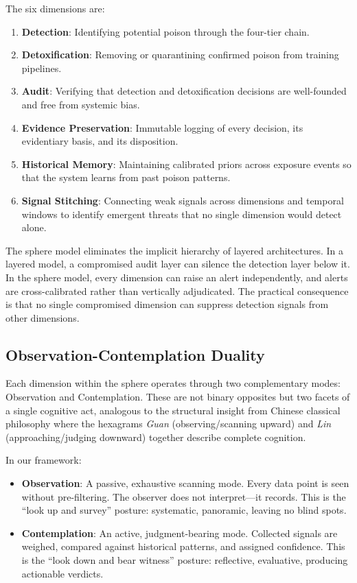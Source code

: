 \documentclass[11pt]{article}
\begin{document}
The six dimensions are:
\begin{enumerate}
  \item \textbf{Detection}: Identifying potential poison through the four-tier chain.
  \item \textbf{Detoxification}: Removing or quarantining confirmed poison from training 
    pipelines.
  \item \textbf{Audit}: Verifying that detection and detoxification decisions are 
    well-founded and free from systemic bias.
  \item \textbf{Evidence Preservation}: Immutable logging of every decision, its 
    evidentiary basis, and its disposition.
  \item \textbf{Historical Memory}: Maintaining calibrated priors across exposure 
    events so that the system learns from past poison patterns.
  \item \textbf{Signal Stitching}: Connecting weak signals across dimensions and 
    temporal windows to identify emergent threats that no single dimension would 
    detect alone.
\end{enumerate}

The sphere model eliminates the implicit hierarchy of layered architectures. In a 
layered model, a compromised audit layer can silence the detection layer below it. 
In the sphere model, every dimension can raise an alert independently, and alerts 
are cross-calibrated rather than vertically adjudicated. The practical consequence 
is that no single compromised dimension can suppress detection signals from other 
dimensions.

\subsection{Observation-Contemplation Duality}

Each dimension within the sphere operates through two complementary modes: 
Observation and Contemplation. These are not binary opposites but two facets of a 
single cognitive act, analogous to the structural insight from Chinese classical 
philosophy where the hexagrams \textit{Guan} (observing/scanning upward) and 
\textit{Lin} (approaching/judging downward) together describe complete cognition.

In our framework:
\begin{itemize}
  \item \textbf{Observation}: A passive, exhaustive scanning mode. Every data point is 
    seen without pre-filtering. The observer does not interpret---it records. This 
    is the ``look up and survey'' posture: systematic, panoramic, leaving no blind 
    spots.
  \item \textbf{Contemplation}: An active, judgment-bearing mode. Collected signals are 
    weighed, compared against historical patterns, and assigned confidence. This is 
    the ``look down and bear witness'' posture: reflective, evaluative, producing 
    actionable verdicts.
\end{itemize}
\end{document}
